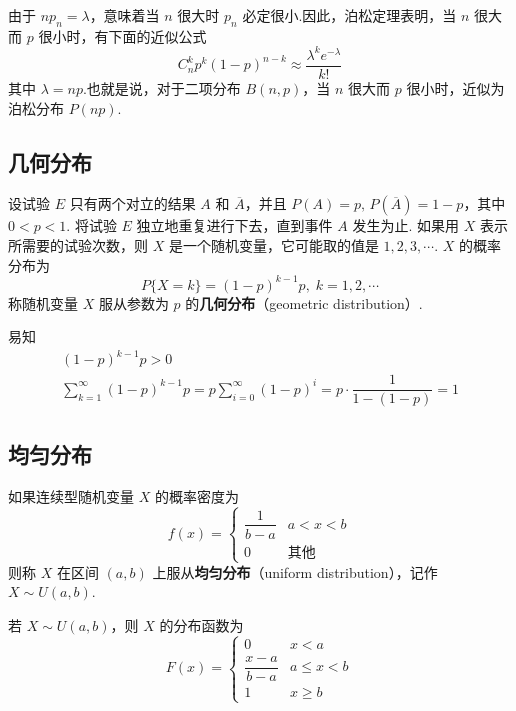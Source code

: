 由于 $n p_n=\lambda$，意味着当 $n$ 很大时 $p_n$ 必定很小.因此，泊松定理表明，当 $n$ 很大而 $p$ 很小时，有下面的近似公式
$$
C_n^k p^k (1-p)^{n-k}\approx \dfrac{\lambda^k e^{-\lambda}}{k!}
$$
其中 $\lambda=np$.也就是说，对于二项分布 $B(n,p)$，当 $n$ 很大而 $p$ 很小时，近似为泊松分布 $P(np)$.

\subsection{几何分布}

设试验 $E$ 只有两个对立的结果 $A$ 和 $\overline{A}$，并且 $P(A)=p, \, P(\overline{A})=1-p$，其中 $0<p<1$. 将试验 $E$ 独立地重复进行下去，直到事件 $A$ 发生为止. 如果用 $X$ 表示所需要的试验次数，则 $X$ 是一个随机变量，它可能取的值是 $1,2,3,\cdots$. $X$ 的概率分布为
$$
P\{X=k\}=(1-p)^{k-1} p, \; k=1,2,\cdots
$$
称随机变量 $X$ 服从参数为 $p$ 的\textbf{几何分布}（geometric distribution）.

易知
\begin{gather*}
    (1-p)^{k-1} p > 0\\
    \sum_{k=1}^\infty (1-p)^{k-1} p = p \sum_{i=0}^\infty (1-p)^i = p \cdot \dfrac{1}{1-(1-p)} = 1    
\end{gather*}
\newline

\subsection{均匀分布}

\begin{definition}
    如果连续型随机变量 $X$ 的概率密度为
    $$
    f(x)=\begin{cases}
        \dfrac{1}{b-a} & a<x<b \\[0.5em]
        0 & \text{其他}
    \end{cases}
    $$
    则称 $X$ 在区间 $(a,b)$ 上服从\textbf{均匀分布}（uniform distribution），记作 $X \sim U(a,b)$.
\end{definition}

若 $X \sim U(a,b)$，则 $X$ 的分布函数为
$$
F(x)=\begin{cases}
    0 & x<a \\[0.2em]
    \dfrac{x-a}{b-a} & a \leqslant x < b \\[0.5em]
    1 & x \geqslant b
\end{cases}
$$


